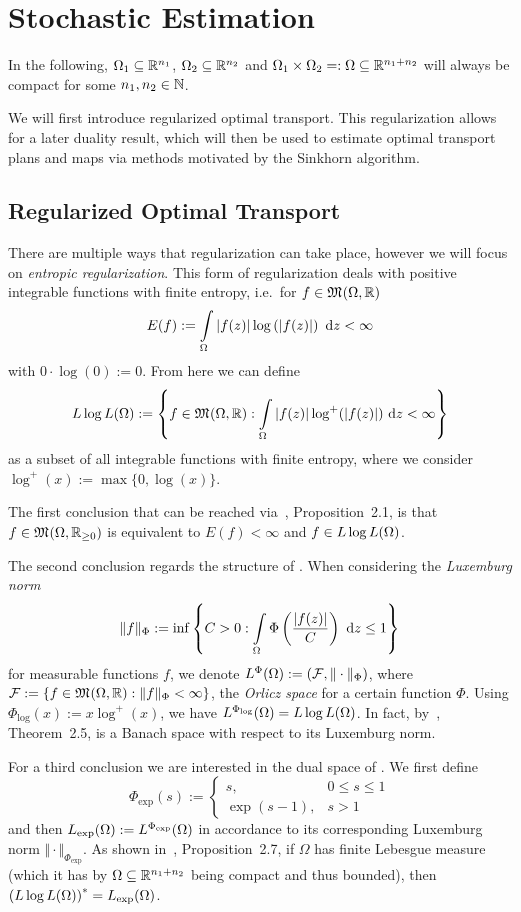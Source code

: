 \chapter{Stochastic Estimation}\label{DualPlanEst}

In the following, $\Omega_1 \subseteq \R^{n_1}$, $\Omega_2 \subseteq \R^{n_2}$ and $\Omega_1 \times \Omega_2 =: \Omega \subseteq \R^{n_1 + n_2}$ will always be compact for some $\NinN[n_1, n_2]$.

We will first introduce regularized optimal transport. This regularization allows for a later duality result, which will then be used to estimate optimal transport plans and maps via methods motivated by the Sinkhorn algorithm.

\section{Regularized Optimal Transport}\label{RegOT}

There are multiple ways that regularization can take place, however we will focus on \textit{entropic regularization}. This form of regularization deals with positive integrable functions with finite entropy, i.e.~for $f \in \MF{\Omega}{\R}$
\[ E(f) := \int\limits_\Omega \vert f(z) \vert \log\left( \vert f(z) \vert \right)~\D[z] < \infty \]
with $0 \cdot \log(0) := 0$. From here we can define
\[ \LLL := \left\{ f \in \MF{\Omega}{\R} : \int\limits_\Omega \vert f(z) \vert \log^+(\vert f(z) \vert)~\D[z] < \infty \right\} \]
as a subset of all integrable functions with finite entropy, where we consider $\log^+(x) := \max \{ 0, \log (x) \}$.

The first conclusion that can be reached via~\cite{Cla2021}, Proposition~2.1, is that $f \in \MF{\Omega}{\RZero}$ is equivalent to $E(f) < \infty$ and $f \in \LLL$.

The second conclusion regards the structure of \LLL{}. When considering the \textit{Luxemburg norm}
\[ \Vert f \Vert_\Phi := \inf \left\{ C > 0 : \int\limits_\Omega \Phi\left( \frac{\vert f(z) \vert}{C} \right)~\D[z] \le 1 \right\} \]
for measurable functions $f$, we denote $\Orlicz{\Phi} := (\mathcal{F}, \Vert \cdot \Vert_\Phi)$, where $\mathcal{F} := \{ f \in \MF{\Omega}{\R} : \Vert f \Vert_\Phi < \infty \}$, the \textit{Orlicz space} for a certain function $\Phi$. Using $\Phi_{\log}(x) := x \log^+ (x)$, we have $\Orlicz{\Phi_{\log}} = \LLL$. In fact, by~\cite{Cla2021}, Theorem~2.5, \LLL{} is a Banach space with respect to its Luxemburg norm.

For a third conclusion we are interested in the dual space of \LLL{}. We first define
\[ \Phi_{\exp}(s) := \begin{cases}
	s, & 0 \le s \le 1 \\
	\exp(s - 1), & s > 1
\end{cases} \]
and then $\Lexp := \Orlicz{\Phi_{\exp}}$ in accordance to its corresponding Luxemburg norm $\Vert \cdot \Vert_{\Phi_{\exp}}$. As shown in~\cite{Cla2021}, Proposition~2.7, if $\Omega$ has finite Lebesgue measure (which it has by $\Omega \subseteq \R^{n_1 + n_2}$ being compact and thus bounded), then ${(\LLL)}^* = \Lexp$.


